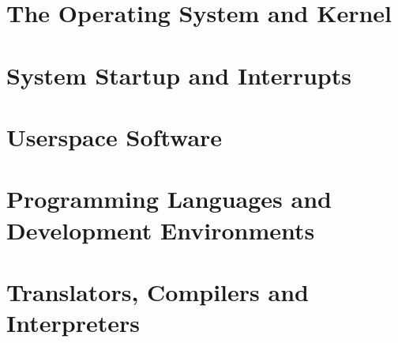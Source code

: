 \documentclass[../main.tex]{subfiles}
\begin{document}


\section{The Operating System and Kernel}
\label{4:sec:the_os_and_kernel}


\section{System Startup and Interrupts}
\label{4:sec:system_startup_and_interrupts}


\section{Userspace Software}
\label{4:sec:userspace_software}


\section{Programming Languages and Development Environments}
\label{4:sec:programming_languages_and_development_environments}


\section{Translators, Compilers and Interpreters}
\label{4:sec:translators_compilers_and_interpreters}

\end{document}
